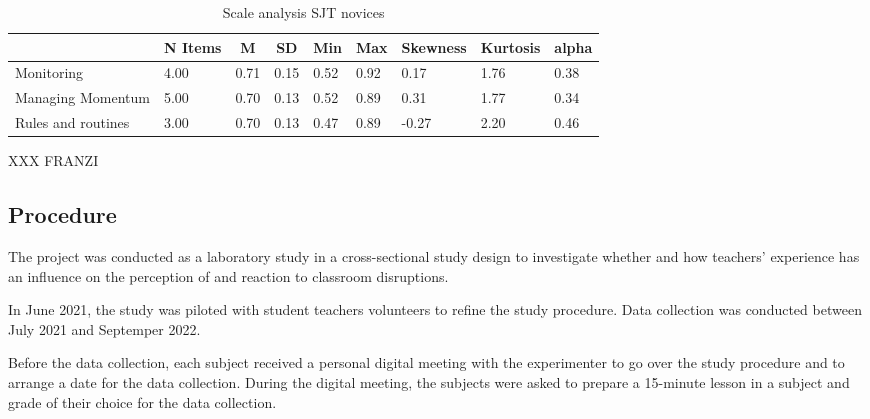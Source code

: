 \documentclass[
  man]{apa6}
\begin{document}
\begin{table}[h]

\begin{center}
\begin{threeparttable}

\caption{\label{tab:sjt}Scale analysis SJT novices}

\tiny{

\begin{tabular}{lllllllll}
\toprule
 & \multicolumn{1}{c}{N Items} & \multicolumn{1}{c}{M} & \multicolumn{1}{c}{SD} & \multicolumn{1}{c}{Min} & \multicolumn{1}{c}{Max} & \multicolumn{1}{c}{Skewness} & \multicolumn{1}{c}{Kurtosis} & \multicolumn{1}{c}{alpha}\\
\midrule
Monitoring & 4.00 & 0.71 & 0.15 & 0.52 & 0.92 & 0.17 & 1.76 & 0.38\\
Managing Momentum & 5.00 & 0.70 & 0.13 & 0.52 & 0.89 & 0.31 & 1.77 & 0.34\\
Rules and routines & 3.00 & 0.70 & 0.13 & 0.47 & 0.89 & -0.27 & 2.20 & 0.46\\
\bottomrule
\end{tabular}

}

\end{threeparttable}
\end{center}

\end{table}

XXX FRANZI

\subsection{Procedure}\label{procedure}

The project was conducted as a laboratory study in a cross-sectional study design to investigate whether and how teachers' experience has an influence on the perception of and reaction to classroom disruptions.

In June 2021, the study was piloted with student teachers volunteers to refine the study procedure. Data collection was conducted between July 2021 and Septemper 2022.

Before the data collection, each subject received a personal digital meeting with the experimenter to go over the study procedure and to arrange a date for the data collection. During the digital meeting, the subjects were asked to prepare a 15-minute lesson in a subject and grade of their choice for the data collection.
\end{document}
